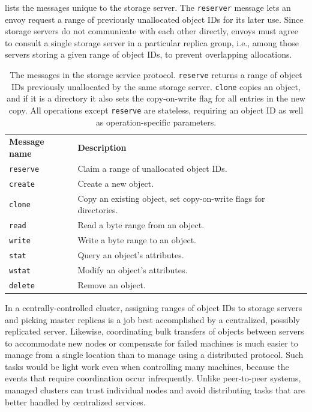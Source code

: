  lists the messages unique to the storage server. The \texttt{reserver} message lets an envoy request a range of previously unallocated object IDs for its later use. Since storage servers do not communicate with each other directly, envoys must agree to consult a single storage server in a particular replica group, i.e., among those servers storing a given range of object IDs, to prevent overlapping allocations.

\begin{table}[tp]
\begin{center}
\begin{tabular}{lp{8cm}}
\textbf{Message name} & \textbf{Description} \\
\texttt{reserve} & Claim a range of unallocated object IDs. \\
\texttt{create} & Create a new object. \\
\texttt{clone} & Copy an existing object, set copy-on-write flags for directories. \\
\texttt{read} & Read a byte range from an object. \\
\texttt{write} & Write a byte range to an object. \\
\texttt{stat} & Query an object's attributes. \\
\texttt{wstat} & Modify an object's attributes. \\
\texttt{delete} & Remove an object. \\
\end{tabular}
\end{center}
\caption[Additional message in the storage service protocol]{The messages in the storage service protocol. \texttt{reserve} returns a range of object IDs previously unallocated by the same storage server. \texttt{clone} copies an object, and if it is a directory it also sets the copy-on-write flag for all entries in the new copy. All operations except \texttt{reserve} are stateless, requiring an object ID as well as operation-specific parameters.}
\label{tab:storage-messages}
\end{table}

In a centrally-controlled cluster, assigning ranges of object IDs to storage servers and picking master replicas is a job best accomplished by a centralized, possibly replicated server. Likewise, coordinating bulk transfers of objects between servers to accommodate new nodes or compensate for failed machines is much easier to manage from a single location than to manage using a distributed protocol. Such tasks would be light work even when controlling many machines, because the events that require coordination occur infrequently. Unlike peer-to-peer systems, managed clusters can trust individual nodes and avoid distributing tasks that are better handled by centralized services.


